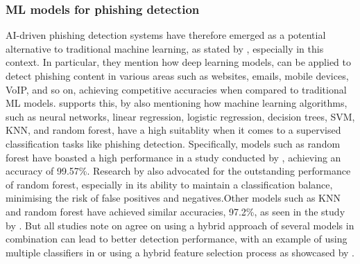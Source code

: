 
\subsubsection*{ML models for phishing detection}
AI-driven phishing detection systems have therefore emerged as a potential alternative to traditional machine learning, as stated by \cite{do2022deep}, especially in this context. In particular, they mention how deep learning models, can be applied to detect phishing content in various areas such as websites, emails, mobile devices, VoIP, and so on, achieving competitive accuracies when compared to traditional ML models. \cite{tang2021survey} supports this, by also mentioning how machine learning algorithms, such as neural networks, linear regression, logistic regression, decision trees, SVM, KNN, and random forest, have a high suitablity when it comes to a supervised classification tasks like phishing detection. Specifically, models such as random forest have boasted a high performance in a study conducted by \cite{gupta2021novel}, achieving an accuracy of 99.57\%. Research by \citep{kapoor2024comparative} also advocated for the outstanding performance of random forest, especially in its ability to maintain a classification balance, minimising the risk of false positives and negatives.Other models such as KNN and random forest have achieved similar accuracies, 97.2\%, as seen in the study by \cite{zamir2020phishing}. But all studies note on agree on using a hybrid approach of several models in combination can lead to better detection performance, with an example of using multiple classifiers in \cite{alsariera2020ai} or using a hybrid feature selection process as showcased by \cite{hamid2013using}.
